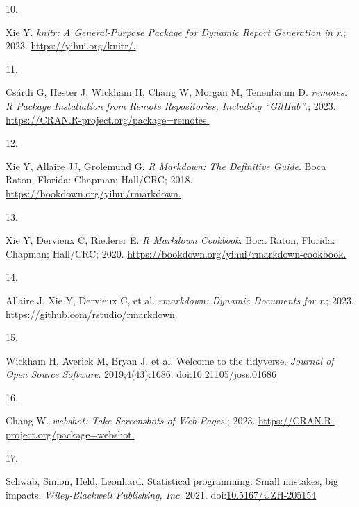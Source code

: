 \documentclass[
]{book}
\newlength{\cslhangindent}
\newlength{\csllabelwidth}
\newlength{\cslentryspacingunit} %
\newenvironment{CSLReferences}[2] %
 {%
  \setlength{\parindent}{0pt}
  \ifodd #1
  \let\oldpar\par
  \def\par{\hangindent=\cslhangindent\oldpar}
  \fi
  \setlength{\parskip}{#2\cslentryspacingunit}
 }%
 {}
\newcommand{\CSLLeftMargin}[1]{\parbox[t]{\csllabelwidth}{#1}}
\newcommand{\CSLRightInline}[1]{\parbox[t]{\linewidth - \csllabelwidth}{#1}\break}
\begin{document}
\begin{CSLReferences}{0}{0}
\leavevmode{}%
\CSLLeftMargin{10. }%
\CSLRightInline{Xie Y. \emph{{knitr}: A General-Purpose Package for Dynamic Report Generation in r}.; 2023. \href{https://yihui.org/knitr/}{https://yihui.org/knitr/.}}

\leavevmode{}%
\CSLLeftMargin{11. }%
\CSLRightInline{Csárdi G, Hester J, Wickham H, Chang W, Morgan M, Tenenbaum D. \emph{{remotes}: R Package Installation from Remote Repositories, Including {``{GitHub}''}}.; 2023. \href{https://CRAN.R-project.org/package=remotes}{https://CRAN.R-project.org/package=remotes.}}

\leavevmode{}%
\CSLLeftMargin{12. }%
\CSLRightInline{Xie Y, Allaire JJ, Grolemund G. \emph{R Markdown: The Definitive Guide}. Boca Raton, Florida: Chapman; Hall/CRC; 2018. \href{https://bookdown.org/yihui/rmarkdown}{https://bookdown.org/yihui/rmarkdown.}}

\leavevmode{}%
\CSLLeftMargin{13. }%
\CSLRightInline{Xie Y, Dervieux C, Riederer E. \emph{R Markdown Cookbook}. Boca Raton, Florida: Chapman; Hall/CRC; 2020. \href{https://bookdown.org/yihui/rmarkdown-cookbook}{https://bookdown.org/yihui/rmarkdown-cookbook.}}

\leavevmode{}%
\CSLLeftMargin{14. }%
\CSLRightInline{Allaire J, Xie Y, Dervieux C, et al. \emph{{rmarkdown}: Dynamic Documents for r}.; 2023. \href{https://github.com/rstudio/rmarkdown}{https://github.com/rstudio/rmarkdown.}}

\leavevmode{}%
\CSLLeftMargin{15. }%
\CSLRightInline{Wickham H, Averick M, Bryan J, et al. Welcome to the {tidyverse}. \emph{Journal of Open Source Software}. 2019;4(43):1686. doi:\href{https://doi.org/10.21105/joss.01686}{10.21105/joss.01686}}

\leavevmode{}%
\CSLLeftMargin{16. }%
\CSLRightInline{Chang W. \emph{{webshot}: Take Screenshots of Web Pages}.; 2023. \href{https://CRAN.R-project.org/package=webshot}{https://CRAN.R-project.org/package=webshot.}}

\leavevmode{}%
\CSLLeftMargin{17. }%
\CSLRightInline{Schwab, Simon, Held, Leonhard. Statistical programming: Small mistakes, big impacts. \emph{Wiley-Blackwell Publishing, Inc}. 2021. doi:\href{https://doi.org/10.5167/UZH-205154}{10.5167/UZH-205154}}


\end{CSLReferences}
\end{document}
